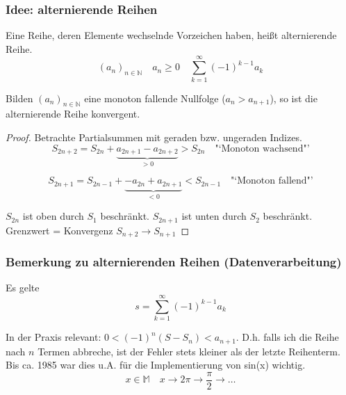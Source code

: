 \subsubsection{Idee: alternierende Reihen} %
\label{sub:idee_alternierende_reihen}

\begin{definition}
	Eine Reihe, deren Elemente wechselnde Vorzeichen haben, heißt alternierende Reihe.
	\[
		(a_n)_{n \in \mathbb{N} } \quad a_n \geq 0 \quad \sum_{k=1}^\infty (-1)^{k-1}a_k
	\]
\end{definition}

\begin{theorem}
	Bilden \( (a_n)_{n\in \mathbb{N}} \) eine monoton fallende Nullfolge (\( a_n>a_{n+1} \)), so ist die alternierende Reihe konvergent.
\end{theorem}

\begin{proof}
	Betrachte Partialsummen mit geraden bzw. ungeraden Indizes.
	\[
		S_{2n+2} = S_{2n} + \underbrace{a_{2n+1}-a_{2n+2}}_{>0} > S_{2n} \quad \text{"`Monoton wachsend"'}
	\]
	
	\[
		S_{2n+1} = S_{2n-1} + \underbrace{-a_{2n}+a_{2n+1}}_{<0} < S_{2n-1} \quad \text{"`Monoton fallend"'}
	\]
	
	\noindent \( S_{2n} \) ist oben durch \( S_1 \) beschränkt. \newline
	\noindent \( S_{2n+1} \) ist unten durch \( S_2 \) beschränkt. \newline\newline
	\noindent Grenzwert = Konvergenz \( S_{n+2}\rightarrow S_{n+1} \)
\end{proof}

\subsubsection{Bemerkung zu alternierenden Reihen (Datenverarbeitung)} %
\label{ssub:bemerkung_zu_alternierenden_reihen_datenverarbeitung_}
Es gelte \[ s=\sum_{k=1}^\infty (-1)^{k-1}a_k \] 

\noindent In der Praxis relevant: \( 0<(-1)^n(S-S_n) < a_{n+1} \). D.h. falls ich die Reihe nach \( n \) Termen abbreche, ist der Fehler stets kleiner als der letzte Reihenterm. Bis ca. 1985 war dies u.A. für die Implementierung von sin(x) wichtig.
\[
	x \in \mathbb{M} \quad x \rightarrow 2\pi \rightarrow \frac{\pi}{2} \rightarrow \ldots
\]


